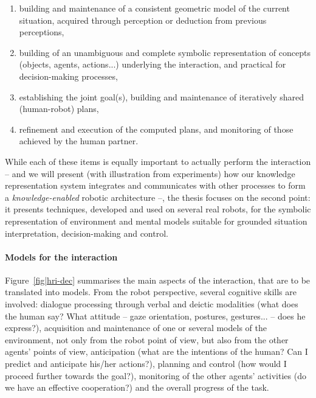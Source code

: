 \begin{enumerate}

    \item building and maintenance of a consistent geometric model of the
        current situation, acquired through perception or deduction from
        previous perceptions,

    \item building of an unambiguous and complete symbolic representation of
    concepts (objects, agents, actions...) underlying the interaction, and
    practical for decision-making processes,

    \item establishing the joint goal(s), building and maintenance of
        iteratively shared (human-robot) plans, 

    \item refinement and execution of the computed plans, and monitoring of
        those achieved by the human partner.

\end{enumerate}

While each of these items is equally important to actually perform the
interaction -- and we will present (with illustration from experiments) how our
knowledge representation system integrates and communicates with other
processes to form a \emph{knowledge-enabled} robotic architecture --, the
thesis focuses on the second point: it presents techniques, developed and used
on several real robots, for the symbolic representation of environment and
mental models suitable for grounded situation interpretation, decision-making
and control.

\paragraph{Models for the interaction} Figure~\ref{fig|hri-dec} summarises the
main aspects of the interaction, that are to be translated into models.  From
the robot perspective, several cognitive skills are involved: dialogue
processing through verbal and deictic modalities (what does the human say? What
attitude -- gaze orientation, postures, gestures... -- does he express?), acquisition
and maintenance of one or several models of the environment, not only from the
robot point of view, but also from the other agents' points of view,
anticipation (what are the intentions of the human? Can I predict and
anticipate his/her actions?), planning and control (how would I proceed further
towards the goal?), monitoring of the other agents' activities (do we have an
effective cooperation?) and the overall progress of the task. 

